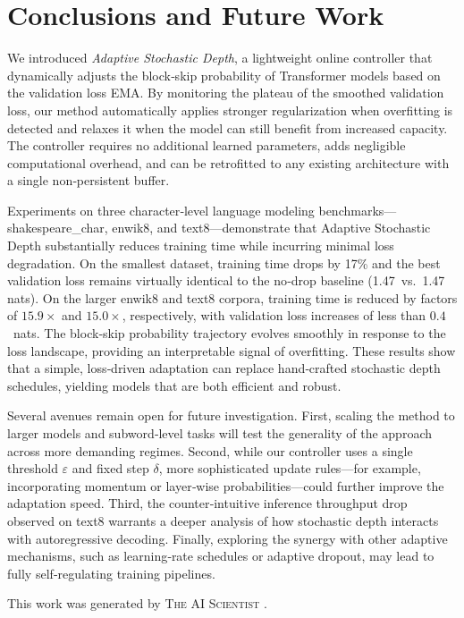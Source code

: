 \documentclass{article} %
\begin{document}
\section{Conclusions and Future Work}
\label{sec:conclusion}

We introduced \textit{Adaptive Stochastic Depth}, a lightweight online controller that dynamically adjusts the block‑skip probability of Transformer models based on the validation loss EMA. By monitoring the plateau of the smoothed validation loss, our method automatically applies stronger regularization when overfitting is detected and relaxes it when the model can still benefit from increased capacity. The controller requires no additional learned parameters, adds negligible computational overhead, and can be retrofitted to any existing architecture with a single non‑persistent buffer.

Experiments on three character‑level language modeling benchmarks—shakespeare\_char, enwik8, and text8—demonstrate that Adaptive Stochastic Depth substantially reduces training time while incurring minimal loss degradation. On the smallest dataset, training time drops by 17\% and the best validation loss remains virtually identical to the no‑drop baseline (1.47~vs.\ 1.47 nats). On the larger enwik8 and text8 corpora, training time is reduced by factors of \(15.9\times\) and \(15.0\times\), respectively, with validation loss increases of less than \(0.4\)~nats. The block‑skip probability trajectory evolves smoothly in response to the loss landscape, providing an interpretable signal of overfitting. These results show that a simple, loss‑driven adaptation can replace hand‑crafted stochastic depth schedules, yielding models that are both efficient and robust.

Several avenues remain open for future investigation. First, scaling the method to larger models and subword‑level tasks will test the generality of the approach across more demanding regimes. Second, while our controller uses a single threshold \(\varepsilon\) and fixed step \(\delta\), more sophisticated update rules—for example, incorporating momentum or layer‑wise probabilities—could further improve the adaptation speed. Third, the counter‑intuitive inference throughput drop observed on text8 warrants a deeper analysis of how stochastic depth interacts with autoregressive decoding. Finally, exploring the synergy with other adaptive mechanisms, such as learning‑rate schedules or adaptive dropout, may lead to fully self‑regulating training pipelines.

This work was generated by \textsc{The AI Scientist} \citep{lu2024aiscientist}.



\end{document}
